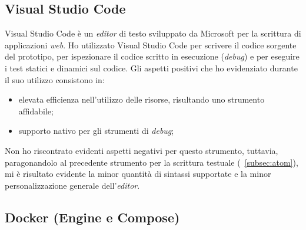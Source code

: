 \subsection{Visual Studio Code}

Visual Studio Code è un \emph{editor} di testo sviluppato da Microsoft per la scrittura di applicazioni \emph{web}.
Ho utilizzato Visual Studio Code per scrivere il codice sorgente del prototipo, per ispezionare il codice scritto in esecuzione (\emph{debug}) e per eseguire i test statici e dinamici sul codice.
Gli aspetti positivi che ho evidenziato durante il suo utilizzo consistono in:
\begin{itemize}
	\item elevata efficienza nell'utilizzo delle risorse, risultando uno strumento affidabile;
	\item supporto nativo per gli strumenti di \emph{debug};
\end{itemize}
Non ho riscontrato evidenti aspetti negativi per questo strumento, tuttavia, paragonandolo al precedente strumento per la scrittura testuale (~\ref{subsec:atom}), mi è risultato evidente la minor quantità di sintassi supportate e la minor personalizzazione generale dell'\emph{editor}.

\subsection{Docker (Engine e Compose)}

